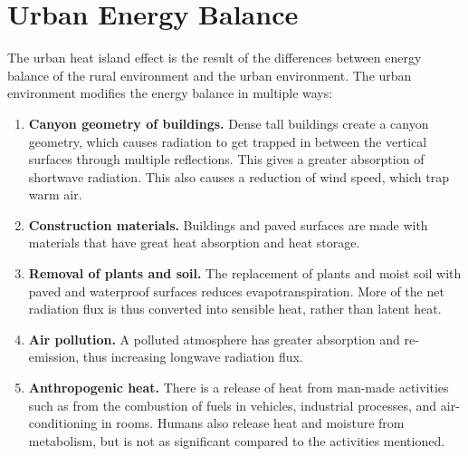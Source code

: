 \section{Urban Energy Balance}
	The urban heat island effect is the result of the differences between energy balance of the rural environment and the urban environment.
	The urban environment modifies the energy balance in multiple ways:
	\begin{enumerate}
		\item \textbf{Canyon geometry of buildings.}
		Dense tall buildings create a canyon geometry,
			which causes radiation to get trapped in between the vertical surfaces through multiple reflections.
		This gives a greater absorption of shortwave radiation.
		This also causes a reduction of wind speed, which trap warm air.
		
		\item \textbf{Construction materials.}
		Buildings and paved surfaces are made with materials that have great heat absorption and heat storage.
		
		\item \textbf{Removal of plants and soil.}
		The replacement of plants and moist soil with paved and waterproof surfaces reduces evapotranspiration.
		More of the net radiation flux is thus converted into sensible heat, rather than latent heat.
		
		\item \textbf{Air pollution.}
		A polluted atmosphere has greater absorption and re-emission, thus increasing longwave radiation flux.
		
		\item \textbf{Anthropogenic heat.}
		There is a release of heat from man-made activities such as from
			the combustion of fuels in vehicles,
			industrial processes, and
			air-conditioning in rooms.
		Humans also release heat and moisture from metabolism, but is not as significant compared to the activities mentioned.
	\end{enumerate}

